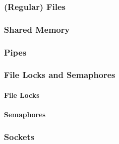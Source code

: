 \subsubsection{(Regular) Files}\label{subsubsec:IPC_Mechanism-Regular_Files}
\subsubsection{Shared Memory}\label{subsubsec:IPC_Mechanism-Shared_Memory}
\subsubsection{Pipes}\label{subsubsec:IPC_Mechanism-Pipes}
\subsubsection{File Locks and Semaphores}\label{subsubsec:IPC_Mechanism-File_Locks_Semaphores}
\paragraph{File Locks}\label{par:File_Locks}
\paragraph{Semaphores}\label{par:Semaphores}
\subsubsection{Sockets}\label{subsubsec:Sockets}

